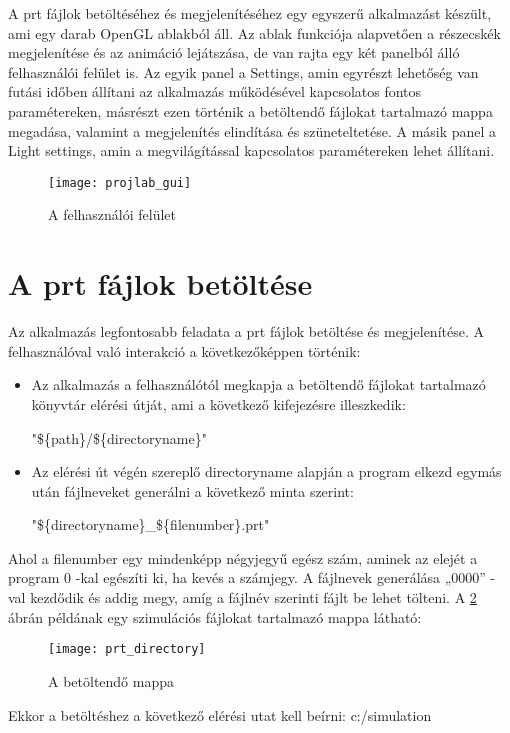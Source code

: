 A prt fájlok betöltéséhez és megjelenítéséhez egy egyszerű alkalmazást készült, 
ami egy darab OpenGL ablakból áll. 
Az ablak funkciója alapvetően a részecskék megjelenítése 
és az animáció lejátszása, 
de van rajta egy két panelból álló felhasználói felület is. 
Az egyik panel a {\ttfamily Settings}, 
amin egyrészt lehetőség van futási időben állítani 
az alkalmazás működésével kapcsolatos fontos paramétereken, 
másrészt ezen történik a betöltendő fájlokat tartalmazó mappa megadása, 
valamint a megjelenítés elindítása és szüneteltetése. 
A másik panel a {\ttfamily Light settings}, 
amin a megvilágítással kapcsolatos paramétereken lehet állítani.

\begin{figure}[h]
\centering
\texttt{[image: projlab\_gui]}
\caption{A felhasználói felület}
\label{fig:x projlabGui}
\end{figure}

\section{A prt fájlok betöltése}

Az alkalmazás legfontosabb feladata a prt fájlok betöltése és megjelenítése. 
A felhasználóval való interakció a következőképpen történik:
\begin{itemize}
\item Az alkalmazás a felhasználótól megkapja 
a betöltendő fájlokat tartalmazó könyvtár elérési útját, 
ami a következő kifejezésre illeszkedik:

{\ttfamily "\$\{path\}/\$\{directoryname\}"}

\item Az elérési út végén szereplő {\ttfamily directoryname} alapján 
a program elkezd egymás után fájlneveket generálni
a következő minta szerint:

{\ttfamily "\$\{directoryname\}\_\$\{filenumber\}.prt"}
\end{itemize}
Ahol a {\ttfamily filenumber} egy mindenképp négyjegyű egész szám, 
aminek az elejét a program 0 -kal egészíti ki, 
ha kevés a számjegy. 
A fájlnevek generálása {\ttfamily „0000”} -val kezdődik és addig megy, 
amíg a fájlnév szerinti fájlt be lehet tölteni. 
A \ref{fig:x prtDirectory} ábrán példának 
egy szimulációs fájlokat tartalmazó mappa látható:
\begin{figure}[h]
\centering
\texttt{[image: prt\_directory]}
\caption{A betöltendő mappa}
\label{fig:x prtDirectory}
\end{figure} \newline
Ekkor a betöltéshez a következő elérési utat kell beírni: {\ttfamily c:/simulation}

